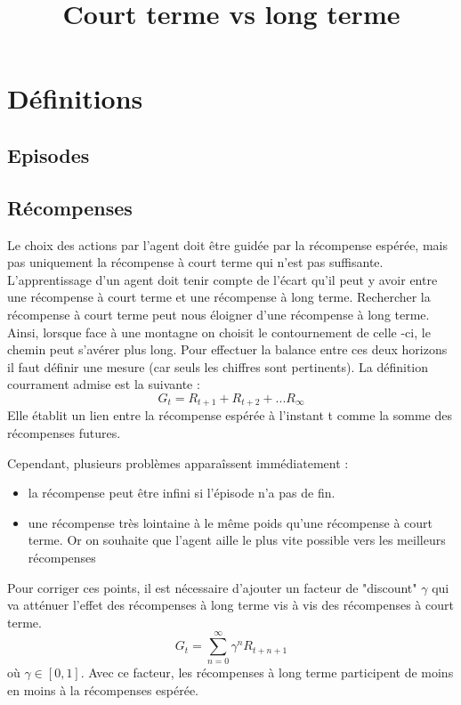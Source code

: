 \documentclass[11pt]{article} %
\title{Court terme vs long terme}
\date{} %
\begin{document}
\maketitle

\section{Définitions}
\subsection{Episodes}
\subsection{Récompenses}
Le choix des actions par l'agent doit être guidée par la récompense espérée, mais pas uniquement la récompense à court terme qui n'est pas suffisante.
L'apprentissage d'un agent doit tenir compte de l'écart qu'il peut y avoir entre une récompense à court terme et une récompense à long terme.
Rechercher la récompense à court terme peut nous éloigner d'une récompense à long terme. Ainsi, lorsque face à une montagne on choisit le contournement de celle -ci, le chemin peut s'avérer plus long. 
Pour effectuer la balance entre ces deux horizons il faut définir une mesure (car seuls les chiffres sont pertinents).
La définition courrament admise est la suivante :
\begin{equation}
G_t = R_{t+1} + R_{t+2} + ... R_{\infty}	
\end{equation}
Elle établit un lien entre  la récompense espérée à l'instant t comme la somme des récompenses futures.

Cependant, plusieurs problèmes apparaîssent immédiatement : 
\begin{itemize}
	\item la récompense peut être infini si l'épisode n'a pas de fin.
	\item une récompense très lointaine à le même poids qu'une récompense à court terme. Or on souhaite que l'agent aille le plus vite possible vers les meilleurs récompenses 
\end{itemize}

Pour corriger ces points, il est nécessaire d'ajouter un facteur de "discount" $\gamma$ qui va atténuer l'effet des récompenses à long terme vis à vis des récompenses à court terme. 
\begin{equation}
G_{t} = \sum_{n=0}^{\infty} \gamma^n R_{t+n+1} 
\end{equation}
où $\gamma \in [0,1]$. Avec ce facteur, les récompenses à long terme participent de moins en moins à la récompenses espérée. 
\end{document}
